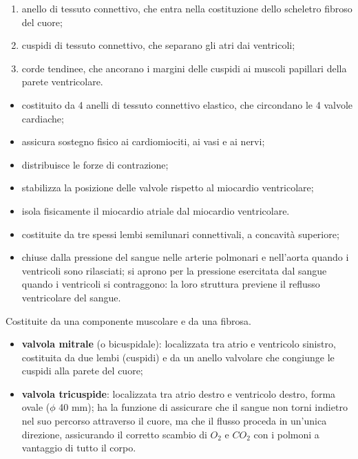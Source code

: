 \begin{enumerate}
  \item anello di tessuto connettivo, che entra nella costituzione dello scheletro fibroso del
    cuore;
  \item cuspidi di tessuto connettivo, che separano gli atri dai ventricoli;
  \item corde tendinee, che ancorano i margini delle cuspidi ai muscoli papillari della parete
    ventricolare.
\end{enumerate}

\begin{itemize}
  \item costituito da 4 anelli di tessuto connettivo elastico, che circondano le 4 valvole
    cardiache;
  \item assicura sostegno fisico ai cardiomiociti, ai vasi e ai nervi;
  \item distribuisce le forze di contrazione;
  \item stabilizza la posizione delle valvole rispetto al miocardio ventricolare;
  \item isola fisicamente il miocardio atriale dal miocardio ventricolare.
\end{itemize}

\begin{itemize}
  \item costituite da tre spessi lembi semilunari connettivali, a concavità superiore;
  \item chiuse dalla pressione del sangue nelle arterie polmonari e nell'aorta quando i
    ventricoli sono rilasciati; si aprono per la pressione esercitata dal sangue quando i
    ventricoli si contraggono: la loro struttura previene il reflusso ventricolare del sangue.
\end{itemize}

Costituite da una componente muscolare e da una fibrosa.
\begin{itemize}
  \item \textbf{valvola mitrale} (o bicuspidale): localizzata tra atrio e ventricolo sinistro,
    costituita da due lembi (cuspidi) e da un anello valvolare che congiunge le cuspidi alla
    parete del cuore;
  \item \textbf{valvola tricuspide}: localizzata tra atrio destro e ventricolo destro, forma
    ovale ($\phi$ 40 mm); ha la funzione di assicurare che il sangue non torni indietro nel suo
    percorso attraverso il cuore, ma che il flusso proceda in un'unica direzione, assicurando il
    corretto scambio di $O_2$ e $CO_2$ con i polmoni a vantaggio di tutto il corpo.
\end{itemize}

